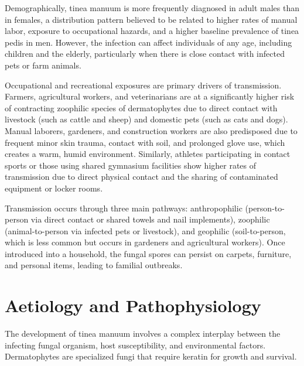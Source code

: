 Demographically, tinea manuum is more frequently diagnosed in adult males than in females, a distribution pattern believed to be related to higher rates of manual labor, exposure to occupational hazards, and a higher baseline prevalence of tinea pedis in men. However, the infection can affect individuals of any age, including children and the elderly, particularly when there is close contact with infected pets or farm animals.

Occupational and recreational exposures are primary drivers of transmission. Farmers, agricultural workers, and veterinarians are at a significantly higher risk of contracting zoophilic species of dermatophytes due to direct contact with livestock (such as cattle and sheep) and domestic pets (such as cats and dogs). Manual laborers, gardeners, and construction workers are also predisposed due to frequent minor skin trauma, contact with soil, and prolonged glove use, which creates a warm, humid environment. Similarly, athletes participating in contact sports or those using shared gymnasium facilities show higher rates of transmission due to direct physical contact and the sharing of contaminated equipment or locker rooms.

Transmission occurs through three main pathways: anthropophilic (person-to-person via direct contact or shared towels and nail implements), zoophilic (animal-to-person via infected pets or livestock), and geophilic (soil-to-person, which is less common but occurs in gardeners and agricultural workers). Once introduced into a household, the fungal spores can persist on carpets, furniture, and personal items, leading to familial outbreaks.

\section*{Aetiology and Pathophysiology}
The development of tinea manuum involves a complex interplay between the infecting fungal organism, host susceptibility, and environmental factors. Dermatophytes are specialized fungi that require keratin for growth and survival.

